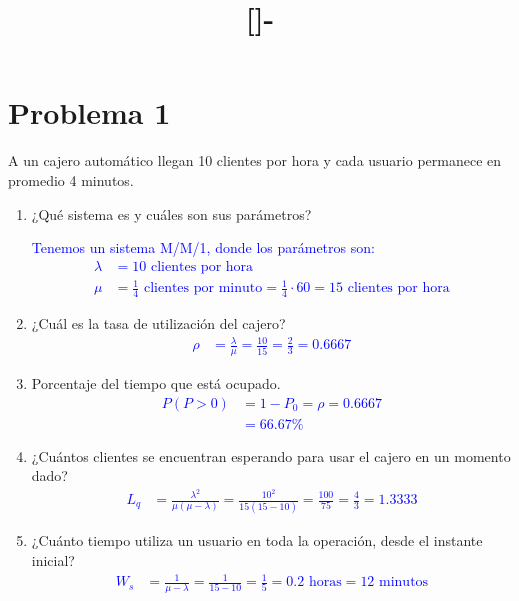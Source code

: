 \documentclass{templateNote}
\newcommand{\newparagraph}{\par\vspace{\baselineskip}\noindent}
\begin{document}

\title{[\asignatura]-\titulo}
\author{
    \autor
}
\portada
\margenes %

\section{Problema 1}
A un cajero automático llegan 10 clientes por hora y cada usuario permanece en promedio 4 minutos.
\begin{enumerate}
    \renewcommand{\labelenumi}{\alph{enumi})}
    \item ¿Qué sistema es y cuáles son sus parámetros?
    \newparagraph
    \textcolor{blue}{
        Tenemos un sistema M/M/1, donde los parámetros son:
        \begin{align*}
            \lambda &= 10 \text{ clientes por hora} \\
            \mu &= \frac{1}{4} \text{ clientes por minuto} = \frac{1}{4} \cdot 60 = 15 \text{ clientes por hora}
        \end{align*}
    }

    \item ¿Cuál es la tasa de utilización del cajero?
    \textcolor{blue}{
        \begin{align*}
            \rho &= \frac{\lambda}{\mu} = \frac{10}{15} = \frac{2}{3} = 0.6667
        \end{align*}
    }

    \item Porcentaje del tiempo que está ocupado.
    \textcolor{blue}{
        \begin{align*}
            P(P > 0) &= 1 - P_0 = \rho = 0.6667 \\
            &= 66.67\% 
        \end{align*}
    }

    \item ¿Cuántos clientes se encuentran esperando para usar el cajero en un momento dado?
    \textcolor{blue}{
        \begin{align*}
            L_q &= \frac{\lambda^2}{\mu(\mu - \lambda)} = \frac{10^2}{15(15 - 10)} = \frac{100}{75} = \frac{4}{3} = 1.3333
        \end{align*}
    }
    \item ¿Cuánto tiempo utiliza un usuario en toda la operación, desde el instante inicial?
    \textcolor{blue}{
        \begin{align*}
            W_s &= \frac{1}{\mu - \lambda} = \frac{1}{15 - 10} = \frac{1}{5} = 0.2 \text{ horas} = 12 \text{ minutos}
        \end{align*}
    }
\end{enumerate}
\end{document}
